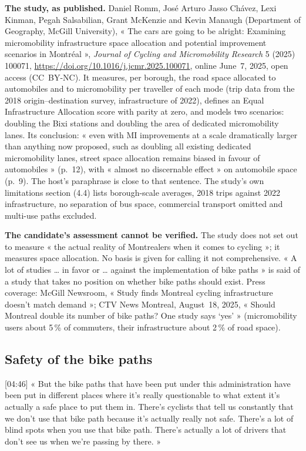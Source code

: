 \documentclass[11pt,letterpaper]{article}
\newcommand{\cliptime}[1]{\textsf{\small[#1]}}
\begin{document}
\textbf{The study, as published.} Daniel Romm, José Arturo Jasso Chávez, Lexi
Kinman, Pegah Salsabilian, Grant McKenzie and Kevin Manaugh (Department of
Geography, McGill University), « The cars are going to be alright: Examining
micromobility infrastructure space allocation and potential improvement
scenarios in Montréal », \emph{Journal of Cycling and Micromobility Research}
5 (2025) 100071, \url{https://doi.org/10.1016/j.jcmr.2025.100071}, online
June~7, 2025, open access (CC~BY-NC). It measures, per borough, the road space
allocated to automobiles and to micromobility per traveller of each mode (trip
data from the 2018 origin--destination survey, infrastructure of 2022), defines
an Equal Infrastructure Allocation score with parity at zero, and models two
scenarios: doubling the Bixi stations and doubling the area of dedicated
micromobility lanes. Its conclusion: « even with MI improvements at a scale
dramatically larger than anything now proposed, such as doubling all existing
dedicated micromobility lanes, street space allocation remains biased in
favour of automobiles » (p.~12), with « almost no discernable effect » on
automobile space (p.~9). The host's paraphrase is close to that sentence. The
study's own limitations section (4.4) lists borough-scale averages, 2018 trips
against 2022 infrastructure, no separation of bus space, commercial transport
omitted and multi-use paths excluded.

\textbf{The candidate's assessment cannot be verified.} The study does not
set out to measure « the actual reality of Montrealers when it comes to
cycling »; it measures space allocation. No basis is given for calling it not
comprehensive. « A lot of studies … in favor or … against the implementation
of bike paths » is said of a study that takes no position on whether bike
paths should exist. Press coverage: McGill Newsroom, « Study finds Montreal
cycling infrastructure doesn't match demand »; CTV News Montreal, August~18,
2025, « Should Montreal double its number of bike paths? One study says
`yes' » (micromobility users about 5\,\% of commuters, their infrastructure
about 2\,\% of road space).

\subsection{Safety of the bike paths}

\cliptime{04:46} « But the bike paths that have been put under this
administration have been put in different places where it's really
questionable to what extent it's actually a safe place to put them in. There's
cyclists that tell us constantly that we don't use that bike path because it's
actually really not safe. There's a lot of blind spots when you use that bike
path. There's actually a lot of drivers that don't see us when we're passing
by there. »
\end{document}
